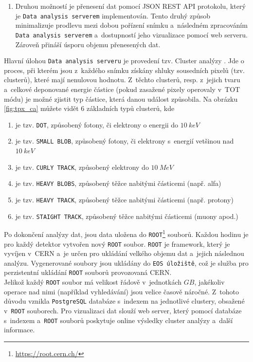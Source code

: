 \begin{description}
\begin{enumerate}
			\item Druhou možností je přenesení dat pomocí JSON REST API protokolu, který je \texttt{Data analysis serverem} implementován. Tento druhý způsob minimalizuje prodlevu mezi dobou pořízení snímku a~následném zpracováním \texttt{Data analysis serverem} a~dostupností jeho vizualizace pomocí web serveru. Zároveň přináší úsporu objemu přenesených dat.
		\end{enumerate}
		Hlavní úlohou \texttt{Data analysis serveru} je provedení tzv. Cluster analýzy \cite{Holy2008287}. Jde o proces, při kterém jsou z~každého snímku získány shluky sousedních pixelů (tzv. clusterů), které mají nenulovou hodnotu. Z~těchto clusterů, resp. z~jejich tvaru a~celkové deponované energie částice (pokud zasažené pixely operovaly v~TOT módu) je možné zjistit typ částice, která danou událost způsobila. Na obrázku \ref{fig:tpx_ca} můžete vidět 6 základních typů clusterů, kde
		 \begin{enumerate}[label=(\alph*)]
			\item je tzv. \texttt{DOT}, způsobený fotony, či elektrony o energii do $10~keV$
			\item je tzv. \texttt{SMALL BLOB}, způsobený fotony, či elektrony s~energií vetšinou nad $10~keV$
			\item je tzv. \texttt{CURLY TRACK}, způsobený elektrony do $10~MeV$
			\item je tzv. \texttt{HEAVY BLOBS}, způsobený těžce nabitými částicemi (např. alfa)
			\item je tzv. \texttt{HEAVY TRACK}, způsobený těžce nabitými částicemi (např. protony)
			\item je tzv. \texttt{STAIGHT TRACK}, způsobený těžce nabitými částicemi (muony apod.)
		\end{enumerate}
		Po dokončení analýzy dat, jsou data uložena do \texttt{ROOT}\footnote{\url{https://root.cern.ch/}} souborů. Každou hodinu je pro každý detektor vytvořen nový \texttt{ROOT} soubor. \texttt{ROOT} je framework, který je vyvíjen v~CERN a~je určen pro ukládání velkého objemu dat a~jejich následnou analýzu. Vygenerované soubory jsou ukládány do \texttt{EOS úložiště}, což je služba pro perzistentní ukládání \texttt{ROOT} souborů provozovaná CERN.\\
		Jelikož každý \texttt{ROOT} soubor má velikost řádově v~jednotkách $GB$, jakékoliv operace nad nimi (například vyhledávání) jsou velice časově náročné. Z~tohoto důvodu vznikla \texttt{PostgreSQL} databáze s~indexem na jednotlivé clustery, obsažené v~\texttt{ROOT} souborech. 
		Pro vizualizaci dat slouží web server, který pomocí databáze s~indexem a~\texttt{ROOT} souborů poskytuje online výsledky cluster analýzy a~další informace.
\end{description}

